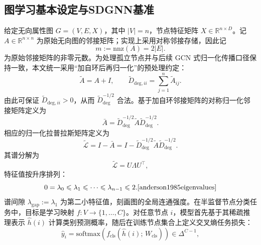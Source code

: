 \subsection{图学习基本设定与SDGNN基准}
\label{subsec:ch3-graph-setup}
\label{subsec:ch3-sdgnn}

给定无向属性图 $G=(V,E,X)$，其中 $|V|=n$，节点特征矩阵 $X\in\mathbb{R}^{n\times D}$。记 $A\in\mathbb{R}^{n\times n}$ 为原始无向图的邻接矩阵；实现上采用对称邻接存储，因此记
\begin{equation}
  m:=\mathrm{nnz}(A)=2|E|.
  \label{eq:ch2-nnz-a}
\end{equation}
为原始邻接矩阵的非零元数。为处理孤立节点并与后续 GCN 式归一化传播口径保持一致，本文统一采用“加自环后再归一化”的预处理约定：
\begin{equation}
  \tilde{A}=A+I,\qquad
  \tilde{D}_{\mathrm{deg},ii}=\sum_{j=1}^{n}\tilde{A}_{ij}.
  \label{eq:ch2-self-loop-degree}
\end{equation}
由此可保证 $\tilde{D}_{\mathrm{deg},ii}>0$，从而 $\tilde{D}_{\mathrm{deg}}^{-1/2}$ 合法。基于加自环邻接矩阵的对称归一化邻接矩阵定义为
\begin{equation}
  \bar{A}
  =
  \tilde{D}_{\mathrm{deg}}^{-1/2}
  \tilde{A}
  \tilde{D}_{\mathrm{deg}}^{-1/2}.
  \label{eq:ch2-normalized-adj}
\end{equation}
相应的归一化拉普拉斯矩阵定义为
\begin{equation}
  \tilde{\mathcal{L}}
  =
  I-\bar{A}
  =
  I-
  \tilde{D}_{\mathrm{deg}}^{-1/2}
  \tilde{A}
  \tilde{D}_{\mathrm{deg}}^{-1/2}.
  \label{eq:ch2-normalized-laplacian}
\end{equation}
其谱分解为
\begin{equation}
  \tilde{\mathcal{L}}=U\Lambda U^\top,
  \label{eq:ch2-laplacian-eigendecomposition}
\end{equation}
特征值按升序排列：
\begin{equation}
  0 = \lambda_0 \leq \lambda_1 \leq \cdots \leq \lambda_{n-1} \leq 2\text{.\cite{anderson1985eigenvalues}}
  \label{eq:ch3-eigenvalue}
\end{equation}
谱间隙 $\lambda_{\mathrm{gap}} := \lambda_1$ 为第二小特征值，刻画图的全局连通强度。在半监督节点分类任务中，目标是学习映射 $f: V \to \{1,\ldots,C\}$。对任意节点 $i$，模型首先基于其稀疏推理表示 $\hat{h}(i)$ 计算类别预测概率，随后在训练节点集合上定义交叉熵任务损失：
\begin{equation}
  \hat{y}_i = \mathrm{softmax}\!\left(f_{\mathrm{cls}}\!\left(\hat{h}(i);\, W_{\mathrm{cls}}\right)\right) \in \Delta^{C-1},
  \label{eq:ch3-prediction}
\end{equation}
